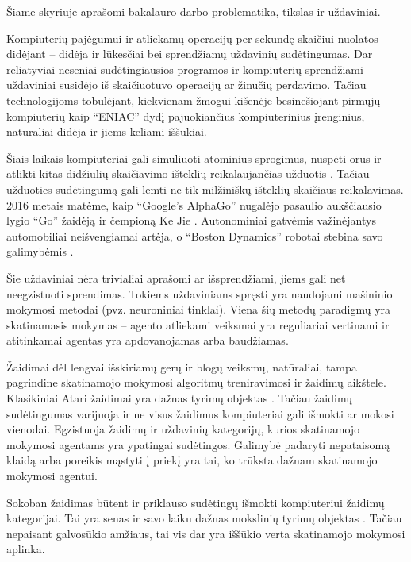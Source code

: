 \documentclass{VUMIFPSbakalaurinis}
\begin{document}
\tableofcontents

\label{sec:ivadas}
{
	Šiame skyriuje aprašomi bakalauro darbo problematika, tikslas ir uždaviniai.
}
\label{subsec:problematika}
{
	Kompiuterių pajėgumui ir atliekamų operacijų per sekundę skaičiui nuolatos didėjant -- didėja ir lūkesčiai bei sprendžiamų uždavinių sudėtingumas. Dar reliatyviai neseniai sudėtingiausios programos ir kompiuterių sprendžiami uždaviniai susidėjo iš skaičiuotuvo operacijų ar žinučių perdavimo. Tačiau technologijoms tobulėjant, kiekvienam žmogui kišenėje besinešiojant pirmųjų kompiuterių kaip \enquote{ENIAC} \cite{computer_history} dydį pajuokiančius kompiuterinius įrenginius, natūraliai didėja ir jiems keliami iššūkiai.\par
	
	Šiais laikais kompiuteriai gali simuliuoti atominius sprogimus, nuspėti orus ir atlikti kitas didžiulių skaičiavimo išteklių reikalaujančias užduotis \cite{supercomputers}. Tačiau užduoties sudėtingumą gali lemti ne tik milžiniškų išteklių skaičiaus reikalavimas. 2016 metais matėme, kaip \enquote{Google’s AlphaGo} nugalėjo pasaulio aukščiausio lygio \enquote{Go} žaidėją ir čempioną Ke Jie \cite{go}. Autonominiai gatvėmis važinėjantys automobiliai neišvengiamai artėja, o \enquote{Boston Dynamics} robotai stebina savo galimybėmis \cite{bostondynamics}.\par
	
	Šie uždaviniai nėra trivialiai aprašomi ar išsprendžiami, jiems gali net neegzistuoti sprendimas. Tokiems uždaviniams spręsti yra naudojami mašininio mokymosi metodai (pvz. neuroniniai tinklai). Viena šių metodų paradigmų yra skatinamasis mokymas -- agento atliekami veiksmai yra reguliariai vertinami ir atitinkamai agentas yra apdovanojamas arba baudžiamas.\par
	
	Žaidimai dėl lengvai išskiriamų gerų ir blogų veiksmų, natūraliai, tampa pagrindine skatinamojo mokymosi algoritmų treniravimosi ir žaidimų aikštele. Klasikiniai Atari žaidimai yra dažnas tyrimų objektas \cite{mnih2013playing}. Tačiau žaidimų sudėtingumas varijuoja ir ne visus žaidimus kompiuteriai gali išmokti ar mokosi vienodai. Egzistuoja žaidimų ir uždavinių kategorijų, kurios skatinamojo mokymosi agentams yra ypatingai sudėtingos. Galimybė padaryti nepataisomą klaidą arba poreikis mąstyti į priekį yra tai, ko trūksta dažnam skatinamojo mokymosi agentui.\par
	
	Sokoban žaidimas būtent ir priklauso sudėtingų išmokti kompiuteriui žaidimų kategorijai. Tai yra senas ir savo laiku dažnas mokslinių tyrimų objektas \cite{culberson1997sokoban, dor1999sokoban, junghanns1998sokoban, schaul2005evolving}. Tačiau nepaisant galvosūkio amžiaus, tai vis dar yra iššūkio verta skatinamojo mokymosi aplinka.	\par
}
\end{document}
